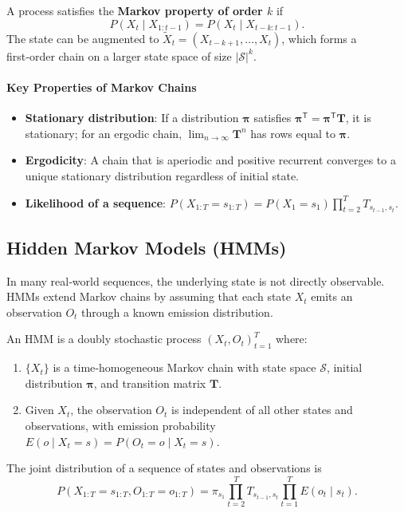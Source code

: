 \documentclass{tufte-handout}
\let\subsubsection\subsection
\begin{document}
\begin{defn}
    A process satisfies the \textbf{Markov property of order $k$} if
    \[
    P(X_t \mid X_{1:t-1}) = P(X_t \mid X_{t-k:t-1}).
    \]
    The state can be augmented to $\tilde{X}_t = (X_{t-k+1}, \dots, X_t)$, which forms a first‑order chain on a larger state space of size $|\mathcal{S}|^k$.
\end{defn}

\paragraph{Key Properties of Markov Chains}

\begin{itemize}
    \item \textbf{Stationary distribution}: If a distribution $\boldsymbol{\pi}$ satisfies $\boldsymbol{\pi}^{\mathsf{T}} = \boldsymbol{\pi}^{\mathsf{T}} \mathbf{T}$, it is stationary; for an ergodic chain, $\lim_{n\to\infty} \mathbf{T}^n$ has rows equal to $\boldsymbol{\pi}$.
    \item \textbf{Ergodicity}: A chain that is aperiodic and positive recurrent converges to a unique stationary distribution regardless of initial state.
    \item \textbf{Likelihood of a sequence}: $P(X_{1:T}=s_{1:T}) = P(X_1=s_1) \prod_{t=2}^T T_{s_{t-1}, s_t}$.
\end{itemize}

\subsubsection{Hidden Markov Models (HMMs)}

In many real‑world sequences, the underlying state is not directly observable. HMMs extend Markov chains by assuming that each state $X_t$ emits an observation $O_t$ through a known emission distribution.

\begin{defn}
    An HMM is a doubly stochastic process $(X_t, O_t)_{t=1}^T$ where:
    \begin{enumerate}
        \item $\{X_t\}$ is a time‑homogeneous Markov chain with state space $\mathcal{S}$, initial distribution $\boldsymbol{\pi}$, and transition matrix $\mathbf{T}$.
        \item Given $X_t$, the observation $O_t$ is independent of all other states and observations, with emission probability $E(o \mid X_t=s) = P(O_t=o \mid X_t=s)$.
    \end{enumerate}
    The joint distribution of a sequence of states and observations is
    \[
    P(X_{1:T}=s_{1:T}, O_{1:T}=o_{1:T}) = \pi_{s_1} \prod_{t=2}^T T_{s_{t-1}, s_t} \prod_{t=1}^T E(o_t \mid s_t).
    \]
\end{defn}
\end{document}
